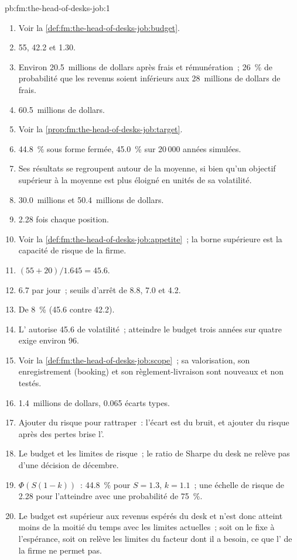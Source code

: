 \begin{solution}{pb:fm:the-head-of-desks-job:1}
\begin{enumerate}
\item Voir la \cref{def:fm:the-head-of-desks-job:budget}.
\item 55, 42.2 et 1.30.
\item Environ 20.5~millions de dollars après frais et rémunération~; 26~\% de probabilité que les revenus soient inférieurs aux 28~millions de dollars de frais.
\item 60.5~millions de dollars.
\item Voir la \cref{prop:fm:the-head-of-desks-job:target}.
\item 44.8~\% sous forme fermée, 45.0~\% sur 20\,000 années simulées.
\item Ses résultats se regroupent autour de la moyenne, si bien qu'un objectif supérieur à la moyenne est plus éloigné en unités de sa volatilité.
\item 30.0~millions et 50.4~millions de dollars.
\item 2.28 fois chaque position.
\item Voir la \cref{def:fm:the-head-of-desks-job:appetite}~; la borne supérieure est la capacité de risque de la firme.
\item $(55+20)/1.645=45.6$.
\item 6.7 par jour~; seuils d'arrêt de 8.8, 7.0 et 4.2.
\item De 8~\% (45.6 contre 42.2).
\item L' autorise 45.6 de volatilité~; atteindre le budget trois années sur quatre exige environ 96.
\item Voir la \cref{def:fm:the-head-of-desks-job:scope}~; sa valorisation, son enregistrement (booking) et son règlement-livraison sont nouveaux et non testés.
\item 1.4~millions de dollars, 0.065 écarts types.
\item Ajouter du risque pour rattraper~: l'écart est du bruit, et ajouter du risque après des pertes brise l'.
\item Le budget et les limites de risque~; le ratio de Sharpe du desk ne relève pas d'une décision de décembre.
\item $\Phi(S(1-k))$~: 44.8~\% pour $S=1.3$, $k=1.1$~; une échelle de risque de 2.28 pour l'atteindre avec une probabilité de 75~\%.
\item Le budget est supérieur aux revenus espérés du desk et n'est donc atteint moins de la moitié du temps avec les limites actuelles~; soit on le fixe à l'espérance, soit
on relève les limites du facteur dont il a besoin, ce que l' de la firme ne permet pas.
\end{enumerate}
\end{solution}

